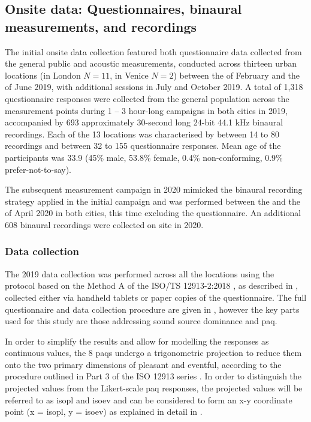 \subsection{Onsite data: Questionnaires, binaural measurements, and recordings}
   The initial onsite data collection featured both questionnaire data collected from the general public and acoustic measurements, conducted across thirteen urban locations (in London $N=11$, in Venice $N=2$) between the  of February and the  of June 2019, with additional sessions in July and October 2019. A total of 1,318 questionnaire responses were collected from the general population across the measurement points during 1 -- 3 hour-long campaigns in both cities in 2019, accompanied by 693 approximately 30-second long 24-bit 44.1 kHz binaural recordings. Each of the 13 locations was characterised by between 14 to 80 recordings and between 32 to 155 questionnaire responses. Mean age of the participants was 33.9 (45\% male, 53.8\% female, 0.4\% non-conforming, 0.9\% prefer-not-to-say).

   The subsequent measurement campaign in 2020 mimicked the binaural recording strategy applied in the initial campaign and was performed between the  and the  of April 2020 in both cities, this time excluding the questionnaire. An additional 608 binaural recordings were collected on site in 2020.

   \subsubsection{Data collection}
   The 2019 data collection was performed across all the locations using the protocol based on the Method A of the ISO/TS 12913-2:2018 \citep{ISO12913_2_2018IOS}, as described in \citep{Aletta2020Assessing,Mitchell2020Soundscape}, collected either via handheld tablets or paper copies of the questionnaire. The full questionnaire and data collection procedure are given in \citet{Mitchell2020Soundscape}, however the key parts used for this study are those addressing sound source dominance and \gls{paq}.

   In order to simplify the results and allow for modelling the responses as continuous values, the 8 \gls{paq}s undergo a trigonometric projection to reduce them onto the two primary dimensions of pleasant and eventful, according to the procedure outlined in Part 3 of the ISO 12913 series \citep{ISO12913_3_2019IOS}. In order to distinguish the projected values from the Likert-scale \gls{paq} responses, the projected values will be referred to as \gls{isopl} and \gls{isoev} and can be considered to form an x-y coordinate point (x = \gls{isopl}, y = \gls{isoev}) as explained in detail in \citet{Lionello2021Introducing}.

